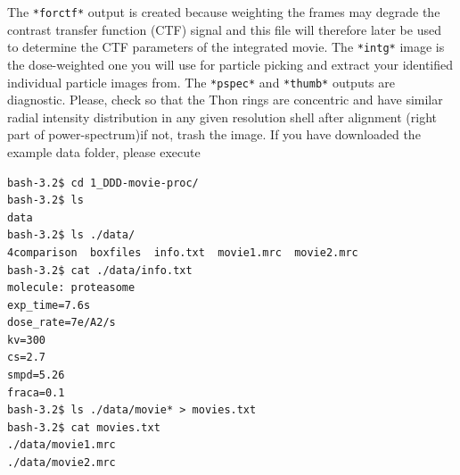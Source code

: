 \documentclass[a4paper,11pt]{article}
\begin{document}
The \texttt{*forctf*} output is created because weighting the frames may degrade the contrast transfer function (CTF) signal and this file will therefore later be used to determine the CTF parameters of the integrated movie. The \texttt{*intg*} image is the dose-weighted one you will use for particle picking and extract your identified individual particle images from. The \texttt{*pspec*} and \texttt{*thumb*} outputs are diagnostic. Please, check so that the Thon rings are concentric and have similar radial intensity distribution in any given resolution shell after alignment (right part of power-spectrum)\textemdash{}if not, trash the image. If you have downloaded the example data folder, please execute

\begin{verbatim}
bash-3.2$ cd 1_DDD-movie-proc/
bash-3.2$ ls
data
bash-3.2$ ls ./data/
4comparison  boxfiles  info.txt  movie1.mrc  movie2.mrc
bash-3.2$ cat ./data/info.txt 
molecule: proteasome
exp_time=7.6s
dose_rate=7e/A2/s
kv=300
cs=2.7
smpd=5.26
fraca=0.1
bash-3.2$ ls ./data/movie* > movies.txt
bash-3.2$ cat movies.txt 
./data/movie1.mrc
./data/movie2.mrc
\end{verbatim}
\end{document}
